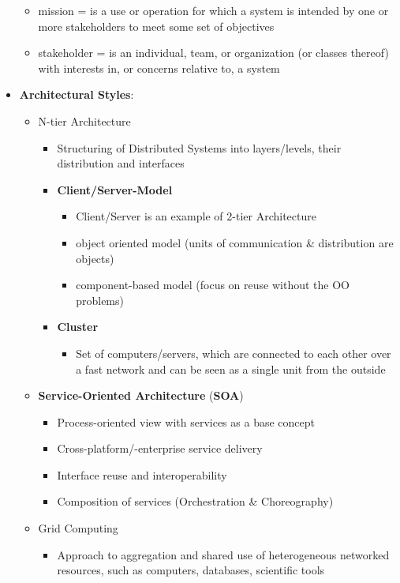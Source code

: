 \documentclass[11pt]{article}
\begin{document}
\begin{itemize}
\begin{itemize}
\item mission = is a use or operation for which a system is intended by one or more stakeholders to meet some set of objectives
\item stakeholder = is an individual, team, or organization (or classes thereof) with interests in, or concerns relative to, a system
\end{itemize}
\item \textbf{Architectural Styles}:
\begin{itemize}
\item N-tier Architecture
\begin{itemize}
\item Structuring of Distributed Systems into layers/levels, their distribution and interfaces
\item \textbf{Client/Server-Model}
\begin{itemize}
\item Client/Server is an example of 2-tier Architecture
\item object oriented model (units of communication \& distribution are objects)
\item component-based model (focus on reuse without the OO problems)
\end{itemize}
\item \textbf{Cluster}
\begin{itemize}
\item Set of computers/servers, which are connected to each other over a fast network and can be seen as a single unit from the outside
\end{itemize}
\end{itemize}
\item \textbf{Service-Oriented Architecture} (\textbf{SOA})  
\begin{itemize}
\item Process-oriented view with services as a base concept
\item Cross-platform/-enterprise service delivery
\item Interface reuse and interoperability
\item Composition of services (Orchestration \& Choreography)
\end{itemize}
\item Grid Computing
\begin{itemize}
\item Approach to aggregation and shared use of heterogeneous networked resources, such as computers, databases, scientific tools
\end{itemize}

\end{itemize}
\end{itemize}
\end{document}
